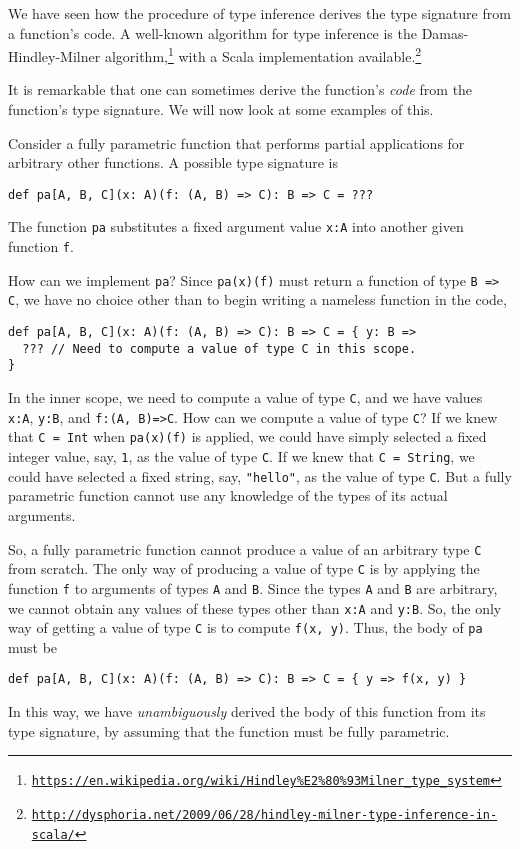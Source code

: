 We have seen how the procedure of type inference
derives the type signature from a function's code. A well-known algorithm
for type inference is the Damas-Hindley-Milner algorithm,\footnote{\texttt{\href{https://en.wikipedia.org/wiki/Hindley\%E2\%80\%93Milner_type_system}{https://en.wikipedia.org/wiki/Hindley\%E2\%80\%93Milner\_type\_system}}}
with a Scala implementation available.\footnote{\texttt{\href{http://dysphoria.net/2009/06/28/hindley-milner-type-inference-in-scala/}{http://dysphoria.net/2009/06/28/hindley-milner-type-inference-in-scala/}}}

It is remarkable that one can sometimes derive the function's \emph{code}
from the function's type signature. We will now look at some examples
of this.

Consider a fully parametric function that performs partial applications
for arbitrary other functions. A possible type signature is
\begin{lstlisting}
def pa[A, B, C](x: A)(f: (A, B) => C): B => C = ???
\end{lstlisting}
The function \lstinline!pa! substitutes a fixed argument value \lstinline!x:A!
into another given function \lstinline!f!. 

How can we implement \lstinline!pa!? Since \lstinline!pa(x)(f)!
must return a function of type \lstinline!B => C!, we have no choice
other than to begin writing a nameless function in the code,
\begin{lstlisting}
def pa[A, B, C](x: A)(f: (A, B) => C): B => C = { y: B =>
  ??? // Need to compute a value of type C in this scope.
}
\end{lstlisting}
In the inner scope, we need to compute a value of type \lstinline!C!,
and we have values \lstinline!x:A!, \lstinline!y:B!, and \lstinline!f:(A, B)=>C!.
How can we compute a value of type \lstinline!C!? If we knew that
\lstinline!C = Int! when \lstinline!pa(x)(f)! is applied, we could
have simply selected a fixed integer value, say, \lstinline!1!, as
the value of type \lstinline!C!. If we knew that \lstinline!C = String!,
we could have selected a fixed string, say, \lstinline!"hello"!,
as the value of type \lstinline!C!. But a fully parametric function
cannot use any knowledge of the types of its actual arguments.

So, a fully parametric function cannot produce a value of an arbitrary
type \lstinline!C! from scratch. The only way of producing a value
of type \lstinline!C! is by applying the function \lstinline!f!
to arguments of types \lstinline!A! and \lstinline!B!. Since the
types \lstinline!A! and \lstinline!B! are arbitrary, we cannot obtain
any values of these types other than \lstinline!x:A! and \lstinline!y:B!.
So, the only way of getting a value of type \lstinline!C! is to compute
\lstinline!f(x, y)!. Thus, the body of \lstinline!pa! must be
\begin{lstlisting}
def pa[A, B, C](x: A)(f: (A, B) => C): B => C = { y => f(x, y) }
\end{lstlisting}
In this way, we have \emph{unambiguously} derived the body of this
function from its type signature, by assuming that the function must
be fully parametric.

